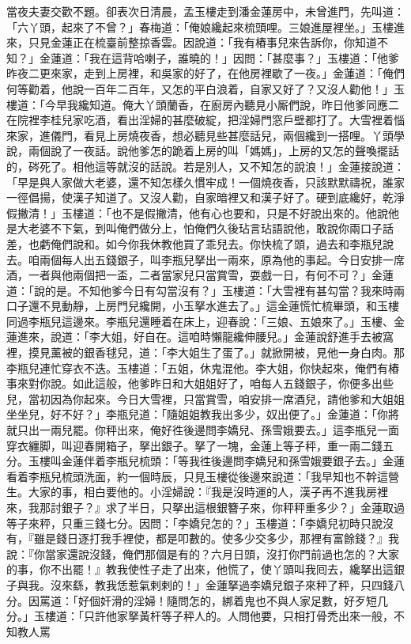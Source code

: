 當夜夫妻交歡不題。卻表次日清晨，孟玉樓走到潘金蓮房中，未曾進門，先叫道：「六丫頭，起來了不曾？」春梅道：「俺娘纔起來梳頭哩。三娘進屋裡坐。」玉樓進來，只見金蓮正在梳臺前整掠香雲。因說道：「我有樁事兒來告訴你，你知道不知？」金蓮道：「我在這背哈喇子，誰曉的！」因問：「甚麼事？」玉樓道：「他爹昨夜二更來家，走到上房裡，和吳家的好了，{}在他房裡歇了一夜。」金蓮道：「俺們何等勸着，他說一百年二百年，又怎的平白浪着，自家又好了？又沒人勸他！」玉樓道：「今早我纔知道。俺大丫頭蘭香，在廚房內聽見小厮們說，昨日他爹同應二在院裡李桂兒家吃酒，看出淫婦的甚麼破綻，把淫婦門窓戶壁都打了。大雪裡着惱來家，進儀門，看見上房燒夜香，想必聽見些甚麼話兒，{}兩個纔到一搭哩。丫頭學說，兩個說了一夜話。說他爹怎的跪着上房的叫「媽媽」，{}上房的又怎的聲喚擺話的，硶死了。相他這等就沒的話說。若是別人，又不知怎的說浪！」{}金蓮接說道：「早是與人家做大老婆，還不知怎樣久慣牢成！一個燒夜香，只該默默禱祝，誰家一徑倡揚，使漢子知道了。又沒人勸，自家暗裡又和漢子好了。硬到底纔好，乾淨假撇清！」玉樓道：「也不是假撇清，{}他有心也要和，只是不好說出來的。他說他是大老婆不下氣，到叫俺們做分上，怕俺們久後玷言玷語說他，敢說你兩口子話差，也虧俺們說和。{}如今你我休教他買了乖兒去。你快梳了頭，過去和李瓶兒說去。咱兩個每人出五錢銀子，叫李瓶兒拏出一兩來，原為他的事起。今日安排一席酒，一者與他兩個把一盃，二者當家兒只當賞雪，耍戲一日，有何不可？」金蓮道：「說的是。不知他爹今日有勾當沒有？」玉樓道：「大雪裡有甚勾當？我來時兩口子還不見動靜，上房門兒纔開，小玉拏水進去了。」這金蓮慌忙梳畢頭，和玉樓同過李瓶兒這邊來。李瓶兒還睡着在床上，迎春說：「三娘、五娘來了。」玉樓、金蓮進來，說道：「李大姐，好自在。這咱時懶龍纔伸腰兒。」金蓮說舒進手去被窩裡，摸見薰被的銀香毬兒{}，道：「李大姐生了蛋了。」{}就掀開被，見他一身白肉。那李瓶兒連忙穿衣不迭。玉樓道：「五姐，休鬼混他。李大姐，你快起來，俺們有樁事來對你說。如此這般，他爹昨日和大姐姐好了，咱每人五錢銀子，你便多出些兒，當初因為你起來。今日大雪裡，只當賞雪，咱安排一席酒兒，請他爹和大姐姐坐坐兒，好不好？」李瓶兒道：「隨姐姐教我出多少，奴出便了。」金蓮道：「你將就只出一兩兒罷。{}你秤出來，俺好徃後邊問李嬌兒、孫雪娥要去。」這李瓶兒一面穿衣纏脚，叫迎春開箱子，拏出銀子。拏了一塊，金蓮上等子秤，重一兩二錢五分。玉樓叫金蓮伴着李瓶兒梳頭：「等我徃後邊問李嬌兒和孫雪娥要銀子去。」金蓮看着李瓶兒梳頭洗面，約一個時辰，只見玉樓從後邊來說道：「我早知也不幹這營生。大家的事，相白要他的。小淫婦說：『我是沒時運的人，漢子再不進我房裡來，我那討銀子？』求了半日，只拏出這根銀簪子來，你秤秤重多少？」金蓮取過等子來秤，只重三錢七分。因問：「李嬌兒怎的？」玉樓道：「李嬌兒初時只說沒有，『雖是錢日逐打我手裡使，都是叩數的。使多少交多少，那裡有富餘錢？』我說：『你當家還說沒錢，俺們那個是有的？{}六月日頭，沒打你門前過也怎的？大家的事，你不出罷！』教我使性子走了出來，他慌了，使丫頭叫我囘去，纔拏出這銀子與我。沒來繇，教我恁惹氣剌剌的！」金蓮拏過李嬌兒銀子來秤了秤，只四錢八分。因罵道：「好個奸滑的淫婦！隨問怎的，綁着鬼也不與人家足數，好歹短几分。」玉樓道：「只許他家拏黃杆等子秤人的。{}人問他要，只相打骨禿出來一般，不知教人罵